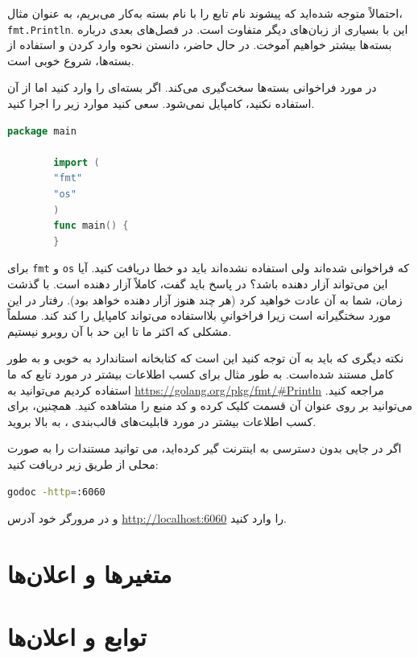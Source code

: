 \documentclass{book}
\begin{document}
احتمالاً متوجه شده‌اید که پیشوند نام تابع را با نام بسته به‌کار می‌بریم، به عنوان مثال، \verb*|fmt.Println|. این با بسیاری از زبان‌های دیگر متفاوت است. در فصل‌های بعدی درباره بسته‌ها بیشتر خواهیم آموخت. در حال حاضر، دانستن نحوه وارد کردن و استفاده از بسته‌ها، شروع خوبی است.

در مورد فراخوانی بسته‌ها سخت‌گیری می‌کند. اگر بسته‌ای را وارد کنید اما از آن استفاده نکنید، کامپایل نمی‌شود. سعی کنید موارد زیر را اجرا کنید.

\begin{latin}
	\begin{lstlisting}[language=Go]
		package main
		
		import (
		"fmt"
		"os"
		)
		func main() {
		}
	\end{lstlisting}
\end{latin}
برای \verb*|fmt| و \verb*|os| که فراخوانی شده‌اند ولی استفاده نشده‌اند باید دو خطا دریافت کنید. آیا این می‌تواند آزار دهنده باشد؟ در  پاسخ باید گفت، کاملاً  آزار دهنده است. با گذشت زمان، شما به آن عادت خواهید کرد (هر چند هنوز آزار دهنده خواهد بود).
رفتار  
 در این مورد سختگیرانه است زیرا فراخوانیِ بلااستفاده می‌تواند کامپایل را کند کند. مسلماً مشکلی که اکثر ما تا این حد با آن روبرو نیستیم. 
 
 نکته دیگری که باید به آن توجه کنید این است که کتابخانه استاندارد  به خوبی و به طور کامل مستند شده‌است. به طور مثال برای کسب اطلاعات بیشتر در مورد تابع  که ما استفاده کردیم می‌توانید به \url{https://golang.org/pkg/fmt/#Println} مراجعه کنید. می‌توانید بر روی عنوان آن قسمت کلیک کرده و کد منبع را مشاهده کنید. همچنین، برای کسب اطلاعات بیشتر در مورد قابلیت‌های قالب‌بندی ، به بالا بروید.
 
اگر در جایی بدون دسترسی به اینترنت گیر کرده‌اید، می توانید مستندات را به صورت محلی از طریق زیر دریافت کنید:
\begin{latin}
	\begin{lstlisting}[language=bash]
	godoc -http=:6060
	\end{lstlisting}
\end{latin}
و  در مرورگر خود آدرس  \url{http://localhost:6060} را وارد کنید.
\linebreak
 
\newpage
\section{متغیرها و اعلان‌ها}

\newpage
\section{توابع و اعلان‌ها}
\end{document}

